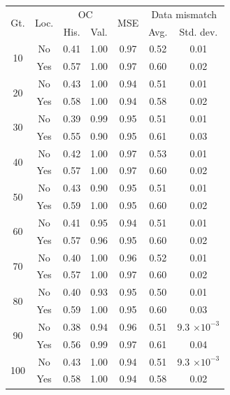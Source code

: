 \begin{tabular}{ccccccc}
\toprule
\multirow{2}{*}{
    Gt.
}
&
\multirow{2}{*}{Loc.} 
& 
\multicolumn{2}{c}{OC} & 
\multirow{2}{*}{
    MSE
} & 
\multicolumn{2}{c}{Data mismatch} 
\\
& & His. & Val. &  & Avg. & Std. dev.
\\
\midrule
\multirow{2}{*}{10} & No & 0.41 & 1.00 & 0.97 & 0.52 & 0.01 \\
 & Yes & 0.57 & 1.00 & 0.97 & 0.60 & 0.02 \\
\midrule
\multirow{2}{*}{20} & No & 0.43 & 1.00 & 0.94 & 0.51 & 0.01 \\
 & Yes & 0.58 & 1.00 & 0.94 & 0.58 & 0.02 \\
\midrule
\multirow{2}{*}{30} & No & 0.39 & 0.99 & 0.95 & 0.51 & 0.01 \\
 & Yes & 0.55 & 0.90 & 0.95 & 0.61 & 0.03 \\
\midrule
\multirow{2}{*}{40} & No & 0.42 & 1.00 & 0.97 & 0.53 & 0.01 \\
 & Yes & 0.57 & 1.00 & 0.97 & 0.60 & 0.02 \\
\midrule
\multirow{2}{*}{50} & No & 0.43 & 0.90 & 0.95 & 0.51 & 0.01 \\
 & Yes & 0.59 & 1.00 & 0.95 & 0.60 & 0.02 \\
\midrule
\multirow{2}{*}{60} & No & 0.41 & 0.95 & 0.94 & 0.51 & 0.01 \\
 & Yes & 0.57 & 0.96 & 0.95 & 0.60 & 0.02 \\
\midrule
\multirow{2}{*}{70} & No & 0.40 & 1.00 & 0.96 & 0.52 & 0.01 \\
 & Yes & 0.57 & 1.00 & 0.97 & 0.60 & 0.02 \\
\midrule
\multirow{2}{*}{80} & No & 0.40 & 0.93 & 0.95 & 0.50 & 0.01 \\
 & Yes & 0.59 & 1.00 & 0.95 & 0.60 & 0.03 \\
\midrule
\multirow{2}{*}{90} & No & 0.38 & 0.94 & 0.96 & 0.51 & 9.3 $\times 10^{-3}$ \\
 & Yes & 0.56 & 0.99 & 0.97 & 0.61 & 0.04 \\
\midrule
\multirow{2}{*}{100} & No & 0.43 & 1.00 & 0.94 & 0.51 & 9.3 $\times 10^{-3}$ \\
 & Yes & 0.58 & 1.00 & 0.94 & 0.58 & 0.02 \\
\bottomrule
\end{tabular}

